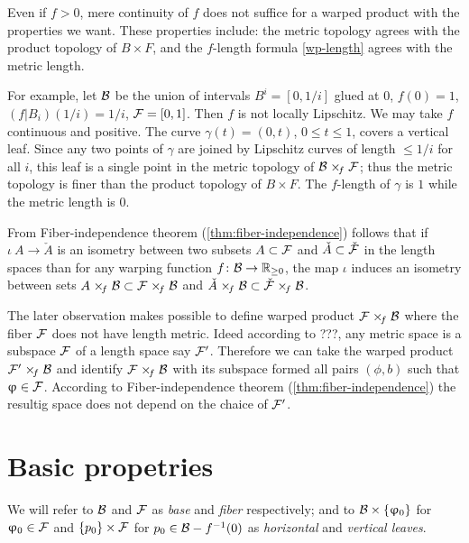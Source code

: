 \medskip

Even if $f>0$, mere continuity of $f$ does not suffice for a warped product with the properties we want. These properties include: the metric topology agrees with the product topology of $B\times F$, and    the $f$-length formula \ref{wp-length} agrees with the metric length.

For example, let $\mathcal{B}$ be the union of intervals $B^i=[0,1/i]$ glued at $0$, $f(0)=1$, $(f|B_i)(1/i)=1/i$, 
$\mathcal{F}=[0,1]$. Then $f$ is not locally Lipschitz. We may take $f$ continuous and positive. 
The curve $\gamma(t)=(0,t)$, $0\le t \le 1$, covers a vertical leaf. Since  any two points of $\gamma$ are joined by Lipschitz curves of length $\le 1/i$ for all $i$,
this leaf is a single point in the metric topology of $\spc{B}\warp{f} \spc{F}$; thus the metric topology is finer than the product topology of $B\times F$. The $f$-length of $\gamma$ is $1$ while the metric length is $0$.  


\medskip

From Fiber-independence theorem (\ref{thm:fiber-independence})
follows that if $\iota\:A\to \check A$ is an isometry between two subsets
$A\subset \spc{F}$ and $\check A\subset \check{\spc{F}}$
in the length spaces than for any warping function $f\:\spc{B}\to\RR_{\ge0}$,
the map $\iota$ induces an isometry between sets 
$A\warp{f} \spc{B}\subset \spc{F}\warp{f} \spc{B}$ and $\check A\warp{f} \spc{B}\subset \check{\spc{F}}\warp{f} \spc{B}$.

The later observation makes possible to define warped product $\spc{F}\warp{f} \spc{B}$ where the fiber $\mathcal{F}$ does not have length metric.
Ideed according to ???, any metric space is a subspace $\mathcal{F}$ of a length space say $\mathcal{F}'$.
Therefore we can take the warped product $\spc{F}'\warp{f} \spc{B}$
and identify $\spc{F}\warp{f} \spc{B}$ with its subspace formed all pairs $(\phi,b)$ such that $\phi\in \spc{F}$.
According to Fiber-independence theorem (\ref{thm:fiber-independence}) the resultig space does not depend on the chaice of $\mathcal{F}'$.





\section{Basic propetries}

We will refer to $\mathcal{B}$ and $\mathcal{F}$ as \emph{base} and \emph{fiber} respectively; 
and to $\spc{B}\times\{\phi_0\}$ for $\phi_0\in  \spc{F}$ and $\{p_0\}\times \spc{F}$ for $p_0\in \spc{B}-f^{-1}(0)$ as \emph{horizontal} and \emph{vertical leaves}.

